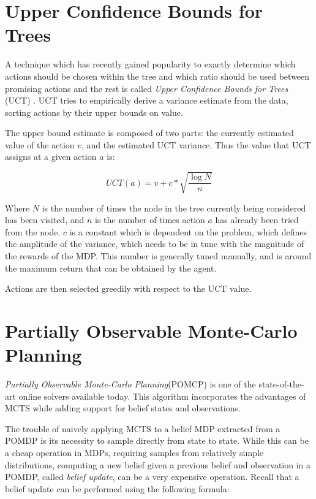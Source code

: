 \section{Upper Confidence Bounds for Trees}

A technique which has recently gained popularity to exactly determine which actions should be chosen
within the tree and which ratio should be used between promising actions and the rest is called
\textit{Upper Confidence Bounds for Trees} (UCT) \cite{cit:uct}. UCT tries to empirically derive a
variance estimate from the data, sorting actions by their upper bounds on value.

The upper bound estimate is composed of two parts: the currently estimated value of the action $v$,
and the estimated UCT variance. Thus the value that UCT assigns at a given action $a$ is:

\[ UCT(a) = v + c*\sqrt{\frac{\log{N}}{n}} \]

Where $N$ is the number of times the node in the tree currently being considered has been visited,
and $n$ is the number of times action $a$ has already been tried from the node. $c$ is a constant
which is dependent on the problem, which defines the amplitude of the variance, which needs to be in
tune with the magnitude of the rewards of the MDP. This number is generally tuned manually, and is
around the maximum return that can be obtained by the agent.

Actions are then selected greedily with respect to the UCT value.

\section[Partially Observable Monte-Carlo Planning]{Partially Observable Monte-Carlo Planning%
}
\label{ref:pomcp}

\textit{Partially Observable Monte-Carlo Planning}(POMCP) \cite{cit:pomcp} is one of the
state-of-the-art online solvers available today. This algorithm incorporates the advantages of MCTS
while adding support for belief states and observations.

The trouble of naively applying MCTS to a belief MDP extracted from a POMDP is its necessity to
sample directly from state to state. While this can be a cheap operation in MDPs, requiring
samples from relatively simple distributions, computing a new belief given a previous belief and
observation in a POMDP, called \textit{belief update}, can be a very expensive operation. Recall that a belief
update can be performed using the following formula:

